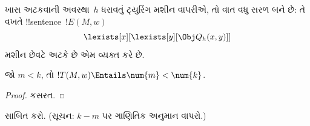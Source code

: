 \documentclass[../../../include/open-logic-section]{subfiles}
\begin{document}
ખાસ અટકવાની અવસ્થા~$h$ ધરાવતું ટ્યુરિંગ મશીન
વાપરીએ, તો વાત વધુ સરળ બને છે: તે વખતે
!!{sentence}~$!E(M, w)$
\[
\lexists[x][\lexists[y][\Obj Q_h(x, y)]]
\]
મશીન છેવટે અટકે છે એમ વ્યક્ત કરે છે.

\begin{prop}
જો $m < k$, તો $!T(M, w) \Entails \num{m} < \num{k}$.
\end{prop}

\begin{proof}
કસરત.
\end{proof}

\begin{prob}
 સાબિત કરો.
(સૂચન: $k-m$ પર ગાણિતિક અનુમાન વાપરો.)
\end{prob}
\end{document}
